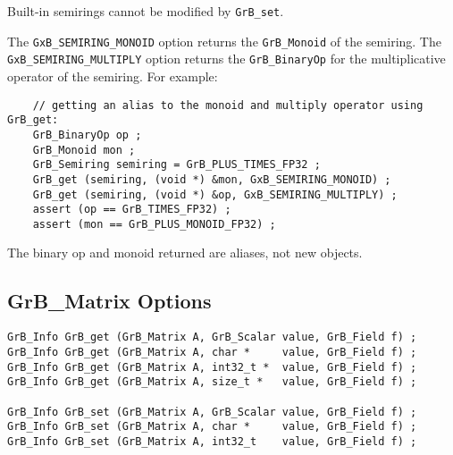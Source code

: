 Built-in semirings cannot be modified by \verb'GrB_set'.

The \verb'GxB_SEMIRING_MONOID' option returns the \verb'GrB_Monoid' of the
semiring.  The \verb'GxB_SEMIRING_MULTIPLY' option returns the
\verb'GrB_BinaryOp' for the multiplicative operator of the semiring.  For
example:

    {\footnotesize
    \begin{verbatim}
    // getting an alias to the monoid and multiply operator using GrB_get:
    GrB_BinaryOp op ;
    GrB_Monoid mon ;
    GrB_Semiring semiring = GrB_PLUS_TIMES_FP32 ;
    GrB_get (semiring, (void *) &mon, GxB_SEMIRING_MONOID) ;
    GrB_get (semiring, (void *) &op, GxB_SEMIRING_MULTIPLY) ;
    assert (op == GrB_TIMES_FP32) ;
    assert (mon == GrB_PLUS_MONOID_FP32) ; \end{verbatim} }

The binary op and monoid returned are aliases, not new objects.

\newpage
\subsection{{\sf GrB\_Matrix} Options}
\label{get_set_matrix}

\begin{mdframed}[userdefinedwidth=6in]
{\footnotesize
\begin{verbatim}
GrB_Info GrB_get (GrB_Matrix A, GrB_Scalar value, GrB_Field f) ;
GrB_Info GrB_get (GrB_Matrix A, char *     value, GrB_Field f) ;
GrB_Info GrB_get (GrB_Matrix A, int32_t *  value, GrB_Field f) ;
GrB_Info GrB_get (GrB_Matrix A, size_t *   value, GrB_Field f) ;

GrB_Info GrB_set (GrB_Matrix A, GrB_Scalar value, GrB_Field f) ;
GrB_Info GrB_set (GrB_Matrix A, char *     value, GrB_Field f) ;
GrB_Info GrB_set (GrB_Matrix A, int32_t    value, GrB_Field f) ;
\end{verbatim}
}\end{mdframed}

